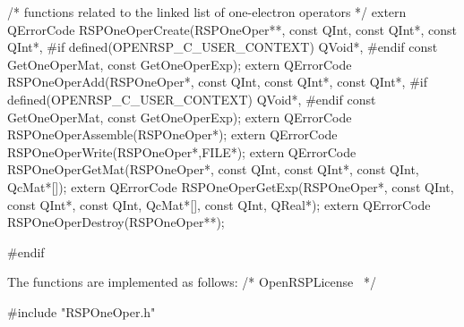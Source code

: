 /* functions related to the linked list of one-electron operators */
extern QErrorCode RSPOneOperCreate(RSPOneOper**,
                                   const QInt,
                                   const QInt*,
                                   const QInt*,
#if defined(OPENRSP_C_USER_CONTEXT)
                                   QVoid*,
#endif
                                   const GetOneOperMat,
                                   const GetOneOperExp);
extern QErrorCode RSPOneOperAdd(RSPOneOper*,
                                const QInt,
                                const QInt*,
                                const QInt*,
#if defined(OPENRSP_C_USER_CONTEXT)
                                QVoid*,
#endif
                                const GetOneOperMat,
                                const GetOneOperExp);
extern QErrorCode RSPOneOperAssemble(RSPOneOper*);
extern QErrorCode RSPOneOperWrite(RSPOneOper*,FILE*);
extern QErrorCode RSPOneOperGetMat(RSPOneOper*,
                                   const QInt,
                                   const QInt*,
                                   const QInt,
                                   QcMat*[]);
extern QErrorCode RSPOneOperGetExp(RSPOneOper*,
                                   const QInt,
                                   const QInt*,
                                   const QInt,
                                   QcMat*[],
                                   const QInt,
                                   QReal*);
extern QErrorCode RSPOneOperDestroy(RSPOneOper**);

#endif
\nwendcode{}\nwdocspar

The functions are implemented as follows:
\nwenddocs{}\endmoddef
/*
  \LA{}OpenRSPLicense~{\nwtagstyle{}}\RA{}
*/

#include "RSPOneOper.h"

